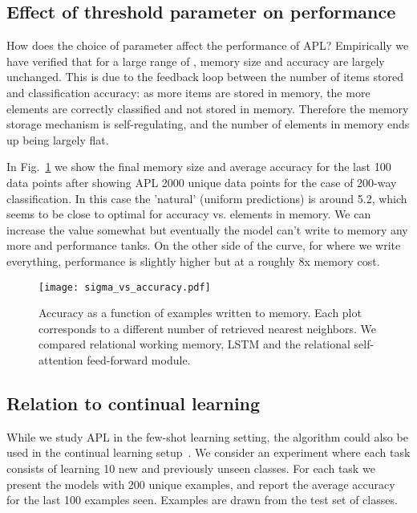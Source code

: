 \documentclass{article} \usepackage{iclr2019_conference,times}
\begin{document}
\subsection{Effect of threshold parameter on performance}

How does the choice of parameter  affect the performance of APL? Empirically we have verified that for a large range of , memory size and accuracy are largely unchanged. This is due to the feedback loop between the number of items stored and classification accuracy: as more items are stored in memory, the more elements are correctly classified and not stored in memory. Therefore the memory storage mechanism is self-regulating, and the number of elements in memory ends up being largely flat. 

In Fig.~\ref{fig:sigma} we show the final memory size and average accuracy for the last 100 data points after showing APL 2000 unique data points for the case of 200-way classification. In this case the 'natural' (uniform predictions)  is around 5.2, which seems to be close to optimal for accuracy vs. elements in memory. We can increase the value somewhat but eventually the model can't write to memory any more and performance tanks. On the other side of the curve, for  where we write everything, performance is slightly higher but at a roughly 8x memory cost.

\begin{figure}[ht!]
\begin{center}
\texttt{[image: sigma\_vs\_accuracy.pdf]}
\end{center}
\caption{Accuracy as a function of examples written to memory. Each plot corresponds to a different number  of retrieved nearest neighbors. We compared relational working memory, LSTM and the relational self-attention feed-forward module.}
\label{fig:sigma}
\end{figure}

\subsection{Relation to continual learning}

While we study APL in the few-shot learning setting, the algorithm could also be used in the continual learning setup~\citep{kirkpatrick2017overcoming, rusu2016progressive, yoon2018lifelong, rebuffi2017icarl}. We consider an experiment where each task consists of learning 10 new and previously unseen classes. For each task we present the models with 200 unique examples, and report the average accuracy for the last 100 examples seen. Examples are drawn from the test set of classes.
\end{document}
